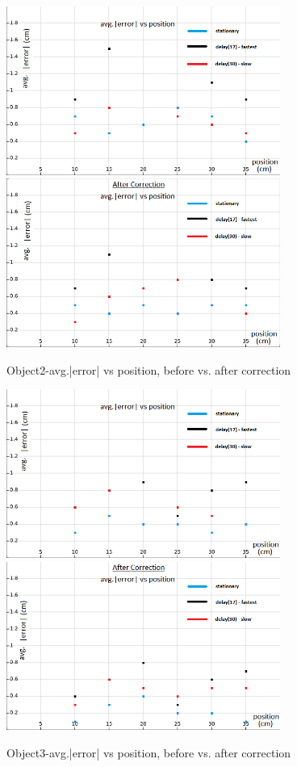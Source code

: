 	\begin{figure}[H]
		\vfill
		\centering
		\includegraphics[width=0.8\textwidth]{../Files/save21}\\
		
		\includegraphics[width=0.8\textwidth]{../Files/save20}
		\caption{Object2-avg.|error| vs position, before vs. after correction}  
	\end{figure}
	\begin{figure}[H]
		\vfill
		\centering
		\includegraphics[width=0.8\textwidth]{../Files/save32}\\
		
		\includegraphics[width=0.8\textwidth]{../Files/save31}
		\caption{Object3-avg.|error| vs position, before vs. after correction}  
	\end{figure}
